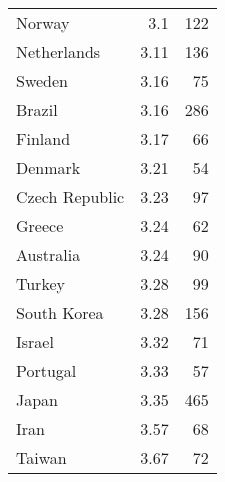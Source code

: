 \documentclass[12pt]{article} %
\begin{document}
\begin{table}[]
\begin{tabular}{lrr}
Norway           & 3.1              & 122                       \\
Netherlands      & 3.11             & 136                       \\
Sweden           & 3.16             & 75                        \\
Brazil           & 3.16             & 286                       \\
Finland          & 3.17             & 66                        \\
Denmark          & 3.21             & 54                        \\
Czech Republic   & 3.23             & 97                        \\
Greece           & 3.24             & 62                        \\
Australia        & 3.24             & 90                        \\
Turkey           & 3.28             & 99                        \\
South Korea      & 3.28             & 156                       \\
Israel           & 3.32             & 71                        \\
Portugal         & 3.33             & 57                        \\
Japan            & 3.35             & 465                       \\
Iran             & 3.57             & 68                        \\
Taiwan           & 3.67             & 72
\end{tabular}
\end{table}


\newpage
\end{document}

